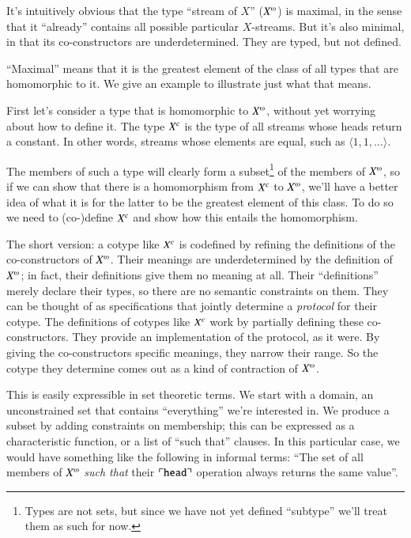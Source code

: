 It's intuitively obvious that the type ``stream of \(X\)''
(\(\colist{X}\)) is maximal, in the sense that it ``already'' contains
all possible particular \(X\)-streams. But it's also minimal, in that
its co-constructors are underdetermined. They are typed, but not
defined.

``Maximal'' means that it is the greatest element of the class of all
types that are homomorphic to it. We give an example to illustrate
just what that means.

First let's consider a type that is homomorphic to \(\colist{X}\),
without yet worrying about how to define it. The type
\({X^{c}}\) is the type of all streams whose heads return a
constant. In other words, streams whose elements are equal, such as
\(\langle 1,1,\ldots\rangle\).

The members of such a type will clearly form a subset\footnote{Types
are not sets, but since we have not yet defined ``subtype'' we'll
treat them as such for now.} of the members of \(\colist{X}\), so if
we can show that there is a homomorphism from \({X^{c}}\) to
\(\colist{X}\), we'll have a better idea of what it is for the latter
to be the greatest element of this class. To do so we need to
(co-)define \({X^{c}}\) and show how this entails the
homomorphism.

The short version: a cotype like \({X^{c}}\) is codefined by
refining the definitions of the co-constructors of \(\colist{X}\).
Their meanings are underdetermined by the definition of
\(\colist{X}\); in fact, their definitions give them no meaning at
all. Their ``definitions'' merely declare their types, so there are no
semantic constraints on them. They can be thought of as specifications
that jointly determine a \textit{protocol} for their cotype. The
definitions of cotypes like \({X^{c}}\) work by partially
defining these co-constructors. They provide an implementation of the
protocol, as it were. By giving the co-constructors specific meanings,
they narrow their range. So the cotype they determine comes out as a
kind of contraction of \(\colist{X}\).

This is easily expressible in set theoretic terms. We start with a
domain, an unconstrained set that contains ``everything'' we're
interested in. We produce a subset by adding constraints on
membership; this can be expressed as a characteristic function, or a
list of ``such that'' clauses. In this particular case, we would have
something like the following in informal terms: ``The set of all
members of \(\colist{X}\) \textit{such that} their
\(\ulcorner\texttt{\upshape head}{}\urcorner\) operation always returns the same
value''.

